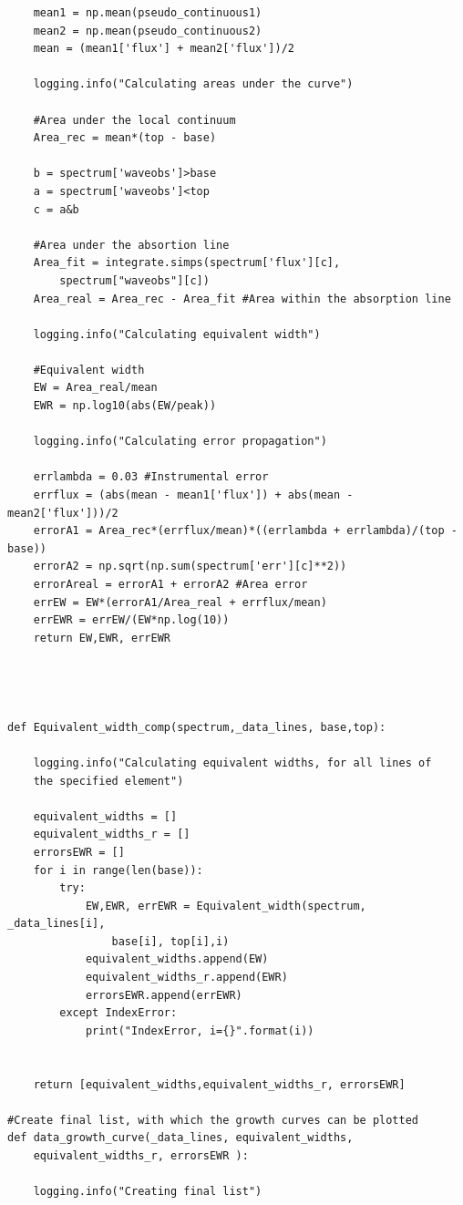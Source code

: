 \documentclass[12pt,oneside,openany,letter]{book}
\begin{document}
\begin{verbatim}
    mean1 = np.mean(pseudo_continuous1)
    mean2 = np.mean(pseudo_continuous2)
    mean = (mean1['flux'] + mean2['flux'])/2

    logging.info("Calculating areas under the curve")
    
    #Area under the local continuum
    Area_rec = mean*(top - base)

    b = spectrum['waveobs']>base
    a = spectrum['waveobs']<top
    c = a&b
    
    #Area under the absortion line 
    Area_fit = integrate.simps(spectrum['flux'][c],
        spectrum["waveobs"][c])
    Area_real = Area_rec - Area_fit #Area within the absorption line

    logging.info("Calculating equivalent width")

    #Equivalent width
    EW = Area_real/mean
    EWR = np.log10(abs(EW/peak))

    logging.info("Calculating error propagation")

    errlambda = 0.03 #Instrumental error
    errflux = (abs(mean - mean1['flux']) + abs(mean - mean2['flux']))/2 
    errorA1 = Area_rec*(errflux/mean)*((errlambda + errlambda)/(top - base))
    errorA2 = np.sqrt(np.sum(spectrum['err'][c]**2))
    errorAreal = errorA1 + errorA2 #Area error
    errEW = EW*(errorA1/Area_real + errflux/mean) 
    errEWR = errEW/(EW*np.log(10))
    return EW,EWR, errEWR




def Equivalent_width_comp(spectrum,_data_lines, base,top):

    logging.info("Calculating equivalent widths, for all lines of 
    the specified element")

    equivalent_widths = []
    equivalent_widths_r = []
    errorsEWR = []
    for i in range(len(base)):
        try:
            EW,EWR, errEWR = Equivalent_width(spectrum, _data_lines[i], 
                base[i], top[i],i)
            equivalent_widths.append(EW)
            equivalent_widths_r.append(EWR)
            errorsEWR.append(errEWR)
        except IndexError:
            print("IndexError, i={}".format(i))

        
    return [equivalent_widths,equivalent_widths_r, errorsEWR]

#Create final list, with which the growth curves can be plotted
def data_growth_curve(_data_lines, equivalent_widths,
    equivalent_widths_r, errorsEWR ):

    logging.info("Creating final list")
    

\end{verbatim}
\end{document}
